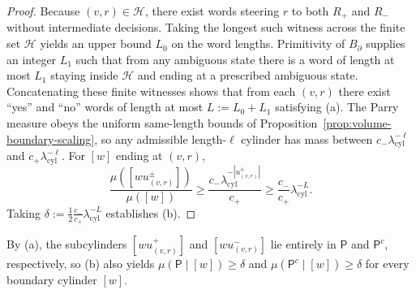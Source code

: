 \begin{proof}
Because $(v,r)\in\mathcal{H}$, there exist words steering $r$ to both $R_+$
and $R_-$ without intermediate decisions.  Taking the longest such witness
across the finite set $\mathcal{H}$ yields an upper bound $L_0$ on the word
lengths.  Primitivity of $B_\partial$ supplies an integer $L_1$ such that from
any ambiguous state there is a word of length at most $L_1$ staying inside
$\mathcal{H}$ and ending at a prescribed ambiguous state.  Concatenating these
finite witnesses shows that from each $(v,r)$ there exist ``yes'' and ``no''
words of length at most $L:=L_0+L_1$ satisfying (a).  The Parry measure obeys
the uniform same-length bounds of Proposition~\ref{prop:volume-boundary-scaling},
so any admissible length-$\ell$ cylinder has mass between
$c_- \lambda_{\mathrm{cyl}}^{-\ell}$ and $c_+ \lambda_{\mathrm{cyl}}^{-\ell}$.
For $[w]$ ending at $(v,r)$,
\[
\frac{\mu([wu_{(v,r)}^\pm])}{\mu([w])}
\ge \frac{c_- \lambda_{\mathrm{cyl}}^{-|u_{(v,r)}^\pm|}}
           {c_+}
\ge \frac{c_-}{c_+}\lambda_{\mathrm{cyl}}^{-L}.
\]
Taking $\delta:=\frac12\frac{c_-}{c_+}\lambda_{\mathrm{cyl}}^{-L}$ establishes
(b).
\end{proof}

By (a), the subcylinders $[wu_{(v,r)}^+]$ and $[wu_{(v,r)}^-]$ lie entirely in
$\mathsf{P}$ and $\mathsf{P}^c$, respectively, so (b) also yields
$\mu(\mathsf{P}\mid[w])\ge\delta$ and $\mu(\mathsf{P}^c\mid[w])\ge\delta$ for
every boundary cylinder $[w]$.

